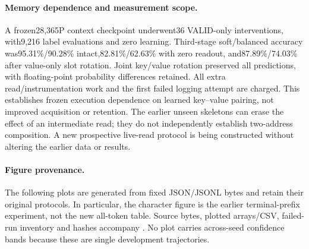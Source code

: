 \paragraph{Memory dependence and measurement scope.}
A frozen28,365P context checkpoint underwent36 VALID-only interventions,
with9,216 label evaluations and zero learning. Third-stage soft/balanced
accuracy was95.31\%/90.28\% intact,82.81\%/62.63\% with zero readout,
and87.89\%/74.03\% after value-only slot rotation. Joint key/value rotation
preserved all predictions, with floating-point probability differences retained.
All extra read/instrumentation work and the first failed logging attempt are
charged. This establishes frozen execution dependence on learned key--value
pairing, not improved acquisition or retention. The earlier unseen skeletons
can erase the effect of an intermediate read; they do not independently
establish two-address composition. A new prospective live-read protocol is
being constructed without altering the earlier data or results.

\paragraph{Figure provenance.}
The following plots are generated from fixed JSON/JSONL bytes and retain their
original protocols. In particular, the character figure is the earlier
terminal-prefix experiment, not the new all-token table. Source bytes, plotted
arrays/CSV, failed-run inventory and hashes accompany
. No plot carries across-seed confidence
bands because these are single development trajectories.

